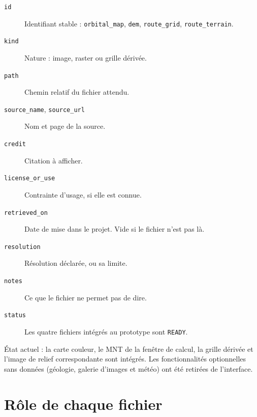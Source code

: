 \documentclass[11pt,a4paper]{article}
\begin{document}
\begin{description}
\item[\texttt{id}] Identifiant stable : \texttt{orbital\_map}, \texttt{dem}, \texttt{route\_grid}, \texttt{route\_terrain}.
\item[\texttt{kind}] Nature : image, raster ou grille dérivée.
\item[\texttt{path}] Chemin relatif du fichier attendu.
\item[\texttt{source\_name}, \texttt{source\_url}] Nom et page de la source.
\item[\texttt{credit}] Citation à afficher.
\item[\texttt{license\_or\_use}] Contrainte d'usage, si elle est connue.
\item[\texttt{retrieved\_on}] Date de mise dans le projet. Vide si le fichier n'est pas là.
\item[\texttt{resolution}] Résolution déclarée, ou sa limite.
\item[\texttt{notes}] Ce que le fichier ne permet pas de dire.
\item[\texttt{status}] Les quatre fichiers intégrés au prototype sont \texttt{READY}.
\end{description}

État actuel : la carte couleur, le MNT de la fenêtre de calcul, la grille dérivée et l'image de relief correspondante sont intégrés. Les fonctionnalités optionnelles sans données (géologie, galerie d'images et météo) ont été retirées de l'interface.

\section{Rôle de chaque fichier}
\end{document}
